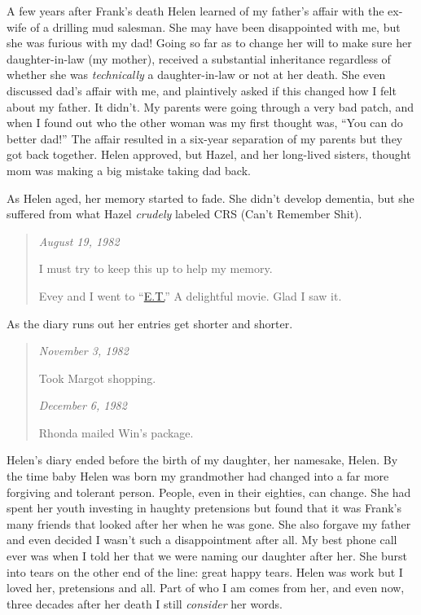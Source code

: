 A few years after Frank's death Helen learned of my father's affair with
the ex-wife of a drilling mud salesman. She may have been disappointed
with me, but she was furious with my dad! Going so far as to change her
will to make sure her daughter-in-law (my mother), received a
substantial inheritance regardless of whether she was \emph{technically} a
daughter-in-law or not at her death. She even discussed dad's affair
with me, and plaintively asked if this changed how I felt about my
father. It didn't. My parents were going through a very bad patch, and
when I found out who the other woman was my first thought was, ``You can
do better dad!'' The affair resulted in a six-year separation of my
parents but they got back together. Helen approved, but Hazel, and her
long-lived sisters, thought mom was making a big mistake taking dad
back.

As Helen aged, her memory started to fade. She didn't develop dementia,
but she suffered from what Hazel \emph{crudely} labeled CRS (Can't
Remember Shit).

\begin{quote}
\emph{August 19, 1982}

I must try to keep this up to help my memory.

Evey and I went to
``\href{https://www.imdb.com/title/tt0083866/?ref_=ttfc_fc_tt}{E.T.}'' A
delightful movie. Glad I saw it.
\end{quote}

As the diary runs out her entries get shorter and shorter.

\begin{quote}
\emph{November 3, 1982}

Took Margot shopping.

\emph{December 6, 1982}

Rhonda mailed Win's package.
\end{quote}

Helen's diary ended before the birth of my daughter, her namesake,
Helen. By the time baby Helen was born my grandmother had changed into a
far more forgiving and tolerant person. People, even in their eighties,
can change. She had spent her youth investing in haughty pretensions but
found that it was Frank's many friends that looked after her when he was
gone. She also forgave my father and even decided I wasn't such a
disappointment after all. My best phone call ever was when I told her
that we were naming our daughter after her. She burst into tears on the
other end of the line: great happy tears. Helen was work but I loved
her, pretensions and all. Part of who I am comes from her, and even now,
three decades after her death I still \emph{consider} her words.

